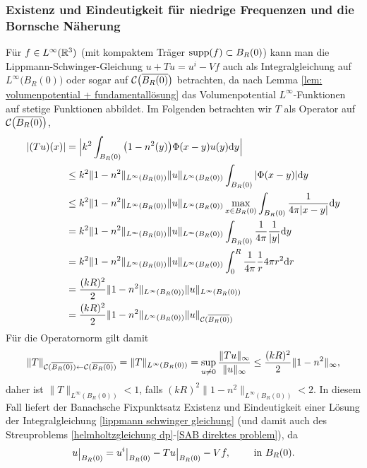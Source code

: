 \subsubsection*{Existenz und Eindeutigkeit für niedrige Frequenzen und die Bornsche Näherung}
Für \(f\in L^\infty(\mathbb{R}^3)\) (mit kompaktem Träger \(\operatorname{supp}(f)\subset B_R(0)\)) kann man die Lippmann-Schwinger-Gleichung \(u+Tu=u^i-Vf\) auch als Integralgleichung auf \(L^\infty\big(B_R(0)\big)\) oder sogar auf \(\mathcal{C}\big(\overline{B_R(0)}\big)\) betrachten, da nach Lemma \ref{lem: volumenpotential + fundamentallösung} das Volumenpotential \(L^\infty\)-Funktionen auf stetige Funktionen abbildet. Im Folgenden betrachten wir \(T\) als Operator auf \(\mathcal{C}\big(\overline{B_R(0)}\big)\),
\begin{align*}
	|(Tu)(x)|&=\Big|k^2\int_{B_R(0)}\big(1-n^2(y)\big)\Phi(x-y)u(y)\mathrm{d}y\Big|\\
	&\leq k^2\|1-n^2\|_{L^\infty(B_R(0))}\|u\|_{L^\infty(B_R(0))}\int_{B_R(0)}|\Phi(x-y)|\mathrm{d}y\\
	&\leq k^2\|1-n^2\|_{L^\infty(B_R(0))}\|u\|_{L^\infty(B_R(0))}\max_{x\in B_R(0)}\int_{B_R(0)}\frac{1}{4\pi|x-y|}\mathrm{d}y\\
	&=k^2\|1-n^2\|_{L^\infty(B_R(0))}\|u\|_{L^\infty(B_R(0))}\int_{B_R(0)}\frac{1}{4\pi}\frac{1}{|y|}\mathrm{d}y\\
	&=k^2\|1-n^2\|_{L^\infty(B_R(0))}\|u\|_{L^\infty(B_R(0))}\int_0^R\frac{1}{4\pi}\frac{1}{r}4\pi r^2\mathrm{d}r\\
	&=\frac{(kR)^2}{2}\|1-n^2\|_{L^\infty(B_R(0))}\|u\|_{L^\infty(B_R(0))}\\
	&=\frac{(kR)^2}{2}\|1-n^2\|_{L^\infty(B_R(0))}\|u\|_{\mathcal{C}(\overline{B_R(0)})}\\
\end{align*}
Für die Operatornorm gilt damit
\begin{equation*}
	\|T\|_{\mathcal{C}(\overline{B_R(0)})\leftarrow\mathcal{C}(\overline{B_R(0)})}=\|T\|_{L^\infty(B_R(0))}=\sup_{u\neq0}\frac{\|Tu\|_\infty}{\|u\|_\infty}\leq\frac{(kR)^2}{2}\|1-n^2\|_\infty,
\end{equation*}
daher ist \(\|T\|_{L^\infty(B_R(0))}<1\), falls \((kR)^2\|1-n^2\|_{L^\infty(B_R(0))}<2\). In diesem Fall liefert der Banachsche Fixpunktsatz Existenz und Eindeutigkeit einer Lösung der Integralgleichung \eqref{lippmann schwinger gleichung} (und damit auch des Streuproblems \eqref{helmholtzgleichung dp}-\eqref{SAB direktes problem}), da
\begin{equation*}
	u\restrict{B_R(0)}=u^i\restrict{B_R(0)}-Tu\restrict{B_R(0)}-Vf,\qquad\te{ in }B_R(0).
\end{equation*}
